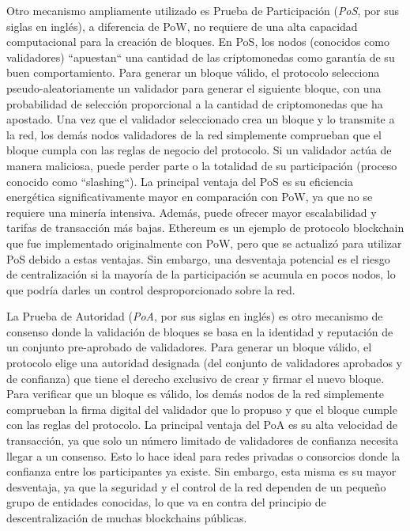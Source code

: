 Otro mecanismo ampliamente utilizado es Prueba de Participación (\textit{PoS}, por sus siglas en inglés), a diferencia de PoW, no requiere de una alta capacidad computacional para la creación de bloques. En PoS, los nodos (conocidos como validadores) ``apuestan`` una cantidad de las criptomonedas como garantía de su buen comportamiento. Para generar un bloque válido, el protocolo selecciona pseudo-aleatoriamente un validador para generar el siguiente bloque, con una probabilidad de selección proporcional a la cantidad de criptomonedas que ha apostado. Una vez que el validador seleccionado crea un bloque y lo transmite a la red, los demás nodos validadores de la red simplemente comprueban que el bloque cumpla con las reglas de negocio del protocolo. Si un validador actúa de manera maliciosa, puede perder parte o la totalidad de su participación (proceso conocido como ``slashing``). La principal ventaja del PoS es su eficiencia energética significativamente mayor en comparación con PoW, ya que no se requiere una minería intensiva. Además, puede ofrecer mayor escalabilidad y tarifas de transacción más bajas. Ethereum es un ejemplo de protocolo blockchain que fue implementado originalmente con PoW, pero que se actualizó para utilizar PoS debido a estas ventajas. Sin embargo, una desventaja potencial es el riesgo de centralización si la mayoría de la participación se acumula en pocos nodos, lo que podría darles un control desproporcionado sobre la red.

La Prueba de Autoridad (\textit{PoA}, por sus siglas en inglés) es otro mecanismo de consenso donde la validación de bloques se basa en la identidad y reputación de un conjunto pre-aprobado de validadores. Para generar un bloque válido, el protocolo elige una autoridad designada (del conjunto de validadores aprobados y de confianza) que tiene el derecho exclusivo de crear y firmar el nuevo bloque. Para verificar que un bloque es válido, los demás nodos de la red simplemente comprueban la firma digital del validador que lo propuso y que el bloque cumple con las reglas del protocolo. La principal ventaja del PoA es su alta velocidad de transacción, ya que solo un número limitado de validadores de confianza necesita llegar a un consenso. Esto lo hace ideal para redes privadas o consorcios donde la confianza entre los participantes ya existe. Sin embargo, esta misma es su mayor desventaja, ya que la seguridad y el control de la red dependen de un pequeño grupo de entidades conocidas, lo que va en contra del principio de descentralización de muchas blockchains públicas.

